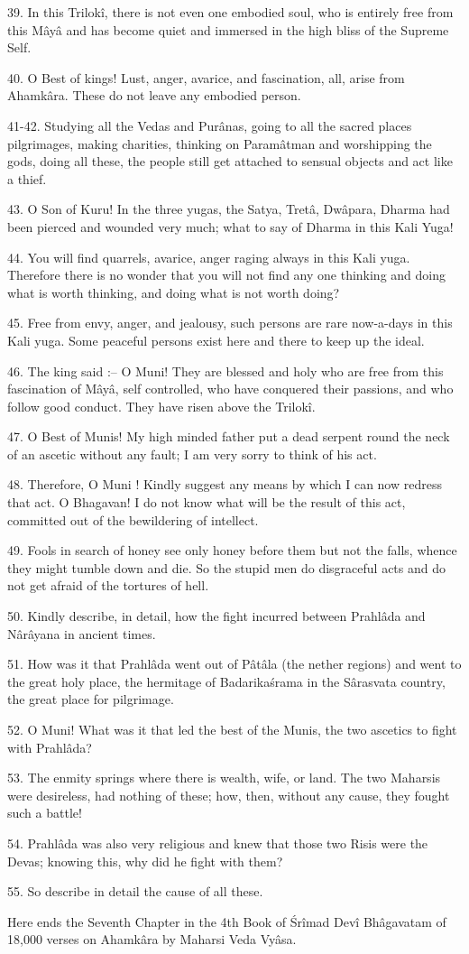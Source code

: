 39. In this Trilok\^i, there is not even one embodied soul, who is entirely free from this M\^ay\^a and has become quiet and immersed in the high bliss of the Supreme Self.

40. O Best of kings! Lust, anger, avarice, and fascination, all, arise from Ahamk\^ara. These do not leave any embodied person.

41-42. Studying all the Vedas and Pur\^anas, going to all the sacred places pilgrimages, making charities, thinking on Param\^atman and worshipping the gods, doing all these, the people still get attached to sensual objects and act like a thief.

43. O Son of Kuru! In the three yugas, the Satya, Tret\^a, Dw\^apara, Dharma had been pierced and wounded very much; what to say of Dharma in this Kali Yuga!

44. You will find quarrels, avarice, anger raging always in this Kali yuga. Therefore there is no wonder that you will not find any one thinking and doing what is worth thinking, and doing what is not worth doing?

45. Free from envy, anger, and jealousy, such persons are rare now-a-days in this Kali yuga. Some peaceful persons exist here and there to keep up the ideal.

46. The king said :-- O Muni! They are blessed and holy who are free from this fascination of M\^ay\^a, self controlled, who have conquered their passions, and who follow good conduct. They have risen above the Trilok\^i.

47. O Best of Munis! My high minded father put a dead serpent round the neck of an ascetic without any fault; I am very sorry to think of his act.

48. Therefore, O Muni ! Kindly suggest any means by which I can now redress that act. O Bhagavan! I do not know what will be the result of this act, committed out of the bewildering of intellect.

49. Fools in search of honey see only honey before them but not the falls, whence they might tumble down and die. So the stupid men do disgraceful acts and do not get afraid of the tortures of hell.

50. Kindly describe, in detail, how the fight incurred between Prahl\^ada and N\^ar\^ayana in ancient times.

51. How was it that Prahl\^ada went out of P\^at\^ala (the nether regions) and went to the great holy place, the hermitage of Badarika\'srama in the S\^arasvata country, the great place for pilgrimage.

52. O Muni! What was it that led the best of the Munis, the two ascetics to fight with Prahl\^ada?

53. The enmity springs where there is wealth, wife, or land. The two Maharsis were desireless, had nothing of these; how, then, without any cause, they fought such a battle!

54. Prahl\^ada was also very religious and knew that those two Risis were the Devas; knowing this, why did he fight with them?

55. So describe in detail the cause of all these.

Here ends the Seventh Chapter in the 4th Book of \'Sr\^imad Dev\^i Bh\^agavatam of 18,000 verses on Ahamk\^ara by Maharsi Veda Vy\^asa.